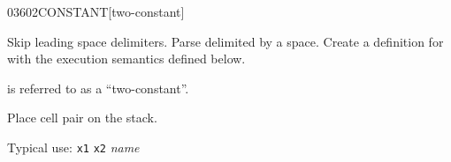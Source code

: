 \begin{worddef}{0360}{2CONSTANT}[two-constant]
\item {}

	Skip leading space delimiters. Parse  delimited by
	a space. Create a definition for  with the execution
	semantics defined below.

	 is referred to as a ``two-constant''.

\execute[name]

	Place cell pair  on the stack.


	\begin{rationale} %
		Typical use:
			\texttt{x1} \texttt{x2}  \emph{name}
	\end{rationale}

	\begin{testing}
		 \\

		 \\

		 \\
		 \\

		 \\
	\end{testing}
\end{worddef}


